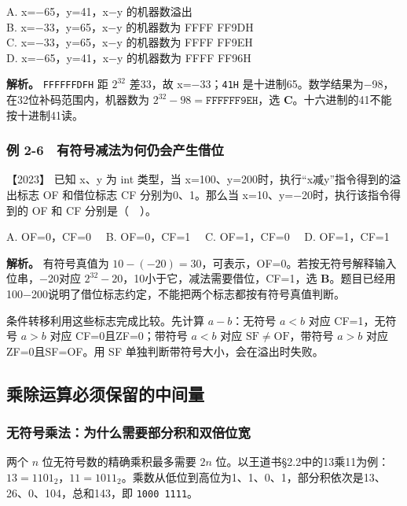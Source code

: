 A. x=−65，y=41，x−y 的机器数溢出\\
B. x=−33，y=65，x−y 的机器数为 FFFF FF9DH\\
C. x=−33，y=65，x−y 的机器数为 FFFF FF9EH\\
D. x=−65，y=41，x−y 的机器数为 FFFF FF96H


\textbf{解析。} \texttt{FFFFFFDFH} 距 \(2^{32}\) 差33，故 x=−33；\texttt{41H} 是十进制65。数学结果为−98，在32位补码范围内，机器数为 \(2^{32}-98=\mathtt{FFFFFF9EH}\)，选 \textbf{C}。十六进制的41不能按十进制41读。

\subsubsection{例 2-6　有符号减法为何仍会产生借位}\label{co-ex2-6}

\noindent{}【2023】 已知 x、y 为 int 类型，当 x=100、y=200时，执行``x减y''指令得到的溢出标志 OF 和借位标志 CF 分别为0、1。那么当 x=10、y=−20时，执行该指令得到的 OF 和 CF 分别是（　）。

A. OF=0，CF=0　 B. OF=0，CF=1　 C. OF=1，CF=0　 D. OF=1，CF=1


\textbf{解析。} 有符号真值为 \(10-(-20)=30\)，可表示，OF=0。若按无符号解释输入位串，−20对应 \(2^{32}-20\)，10小于它，减法需要借位，CF=1，选 \textbf{B}。题目已经用100−200说明了借位标志约定，不能把两个标志都按有符号真值判断。

条件转移利用这些标志完成比较。先计算 \(a-b\)：无符号 \(a<b\) 对应 CF=1，无符号 \(a>b\) 对应 CF=0且ZF=0；带符号 \(a<b\) 对应 \(\mathrm{SF}\ne\mathrm{OF}\)，带符号 \(a>b\) 对应ZF=0且SF=OF。用 SF 单独判断带符号大小，会在溢出时失败。

\subsection{乘除运算必须保留的中间量}\label{co-02-06}

\subsubsection{无符号乘法：为什么需要部分积和双倍位宽}\label{ux65e0ux7b26ux53f7ux4e58ux6cd5ux4e3aux4ec0ux4e48ux9700ux8981ux90e8ux5206ux79efux548cux53ccux500dux4f4dux5bbd}

两个 \(n\) 位无符号数的精确乘积最多需要 \(2n\) 位。以王道书§2.2中的13乘11为例：\(13=1101_2\)，\(11=1011_2\)。乘数从低位到高位为1、1、0、1，部分积依次是13、26、0、104，总和143，即 \texttt{1000\ 1111}。

